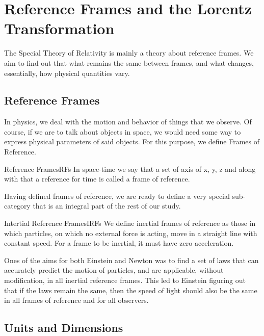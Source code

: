 \documentclass[16pt]{scrartcl}
\numberwithin{equation}{section}
\theoremstyle{plain}
\theoremstyle{definition}
\begin{document}
\pagebreak

\section{Reference Frames and the Lorentz Transformation}

The Special Theory of Relativity is mainly a theory about reference frames. We aim to find out that what remains the same between frames, and what changes, essentially, how physical quantities vary.

\subsection{Reference Frames}
\label{sec:RFs}

In physics, we deal with the motion and behavior of things that we observe. Of course, if we are to talk about objects in space, we would need some way to express physical parameters of said objects. For this purpose, we define Frames of Reference.

\begin{defn}{Reference Frames}{RFs}
    In space-time we say that a set of axis of x, y, z and along with that a reference for time is called a frame of reference.
\end{defn}

Having defined frames of reference, we are ready to define a very special sub-category that is an integral part of the rest of our study.

\begin{defn}{Intertial Reference Frames}{IRFs}
    We define inertial frames of reference as those in which particles, on which no external force is acting, move in a straight line with constant speed. For a frame to be inertial, it must have zero acceleration.
\end{defn}

Ones of the aims for both Einstein and Newton was to find a set of laws that can accurately predict the motion of particles, and are applicable, without modification, in all inertial reference frames. This led to Einstein figuring out that if the laws remain the same, then the speed of light should also be the same in all frames of reference and for all observers.

\subsection*{Units and Dimensions}
\end{document}
